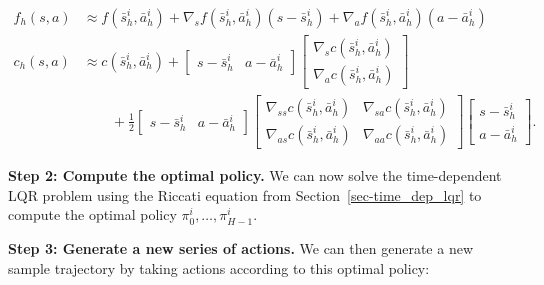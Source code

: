 \documentclass[
  letterpaper,
  DIV=11,
  numbers=noendperiod]{scrreprt}
\theoremstyle{plain}
\theoremstyle{plain}
\theoremstyle{definition}
\theoremstyle{definition}
\theoremstyle{remark}
\begin{document}
\[
\begin{aligned}
    f_h(s, a) & \approx f(\bar {s}^i_h, \bar {a}^i_h) + \nabla_{s} f(\bar {s}^i_h, \bar {a}^i_h)(s- \bar {s}^i_h) + \nabla_{a} f(\bar {s}^i_h, \bar {a}^i_h)(a- \bar {a}^i_h)                         \\
    c_h(s, a) & \approx c(\bar {s}^i_h, \bar {a}^i_h) + \begin{bmatrix}
                                                              s- \bar {s}^i_h& a- \bar {a}^i_h
                                                          \end{bmatrix} \begin{bmatrix}
                                                                            \nabla_{s} c(\bar {s}^i_h, \bar {a}^i_h)\\
                                                                            \nabla_{a} c(\bar {s}^i_h, \bar {a}^i_h)
                                                                        \end{bmatrix}                                                      \\
                     & \qquad + \frac{1}{2} \begin{bmatrix}
                                                s- \bar {s}^i_h& a- \bar {a}^i_h
                                            \end{bmatrix} \begin{bmatrix}
                                                              \nabla_{ss} c(\bar {s}^i_h, \bar {a}^i_h)  & \nabla_{sa} c(\bar {s}^i_h, \bar {a}^i_h)  \\
                                                              \nabla_{as} c(\bar {s}^i_h, \bar {a}^i_h) & \nabla_{aa} c(\bar {s}^i_h, \bar {a}^i_h)
                                                          \end{bmatrix}
    \begin{bmatrix}
        s- \bar {s}^i_h\\
        a- \bar {a}^i_h
    \end{bmatrix}.
\end{aligned}
\]

\textbf{Step 2: Compute the optimal policy.} We can now solve the
time-dependent LQR problem using the Riccati equation from
Section~\ref{sec-time_dep_lqr} to compute the optimal policy
\(\pi^i_0, \dots, \pi^i_{H-1}\).

\textbf{Step 3: Generate a new series of actions.} We can then generate
a new sample trajectory by taking actions according to this optimal
policy:
\end{document}
